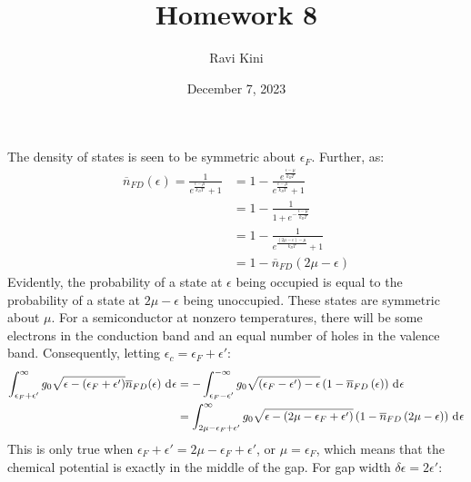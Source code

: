 \documentclass{article}
\title{Homework 8}
\author{Ravi Kini}
\date{December 7, 2023}
\begin{document}
\maketitle

The density of states is seen to be symmetric about $\epsilon_F$. Further, as:
\begin{equation}
    \begin{split}
        \overline{n}_{FD}\left(\epsilon\right) = \frac{1}{e^{\frac{\epsilon - \mu}{k_BT}} + 1} & = 1 - \frac{e^{\frac{\epsilon - \mu}{k_BT}}}{e^{\frac{\epsilon - \mu}{k_BT}} + 1} \\
        & = 1 - \frac{1}{1 + e^{-\frac{\epsilon - \mu}{k_BT}}} \\
        & = 1 - \frac{1}{e^{\frac{(2\mu-\epsilon) - \mu}{k_BT}} + 1} \\
        & = 1 - \overline{n}_{FD}(2\mu - \epsilon)
    \end{split}
\end{equation}
Evidently, the probability of a state at $\epsilon$ being occupied is equal to the probability of a state at $2\mu - \epsilon$ being unoccupied. These states are symmetric about $\mu$. For a semiconductor at nonzero temperatures, there will be some electrons in the conduction band and an equal number of holes in the valence band. Consequently, letting $\epsilon_c = \epsilon_F + \epsilon'$:
\begin{equation}
    \begin{split}
        \int_{\epsilon_F + \epsilon'}^{\infty} g_0\sqrt{\epsilon - \left(\epsilon_F + \epsilon'\right)}\overline{n}_{FD}(\epsilon) \, \diff{\epsilon} & = -\int_{\epsilon_F - \epsilon'}^{-\infty} g_0\sqrt{\left(\epsilon_F - \epsilon'\right) - \epsilon}\left(1 - \overline{n}_{FD}\left(\epsilon\right)\right) \, \diff{\epsilon} \\
        & = \int_{2\mu - \epsilon_F + \epsilon'}^{\infty} g_0\sqrt{\epsilon - \left(2\mu - \epsilon_F + \epsilon'\right)}\left(1 - \overline{n}_{FD}\left(2\mu - \epsilon\right)\right) \, \diff{\epsilon}
    \end{split}
\end{equation}
This is only true when $\epsilon_F + \epsilon' = 2\mu - \epsilon_F + \epsilon'$, or $\mu = \epsilon_F$, which means that the chemical potential is exactly in the middle of the gap.
For gap width $\delta\epsilon = 2\epsilon'$:
\end{document}
